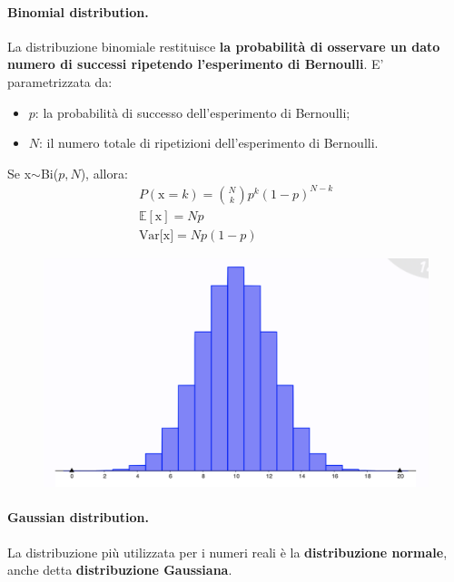 \paragraph{Binomial distribution.} La distribuzione binomiale restituisce \textbf{la probabilità di osservare un dato numero di successi ripetendo l'esperimento di Bernoulli}. E' parametrizzata da:
\begin{itemize}
    \item $p$: la probabilità di successo dell'esperimento di Bernoulli;
    \item $N$: il numero totale di ripetizioni dell'esperimento di Bernoulli.
\end{itemize}
Se x$\sim$Bi($p,N$), allora:
\begin{gather}
    P(\text{x}=k)=\binom{N}{k}p^k(1-p)^{N-k}\\
    \mathbb{E}[\text{x}]=Np\\
    \text{Var[x]}=Np(1-p)
\end{gather}
\begin{figure}[!h]
    \includegraphics[scale=.5]{images/prerequisites/binomial.png}
    \centering
\end{figure}
\newpage
\paragraph{Gaussian distribution.} La distribuzione più utilizzata per i numeri reali è la \textbf{distribuzione normale}, anche detta \textbf{distribuzione Gaussiana}.


